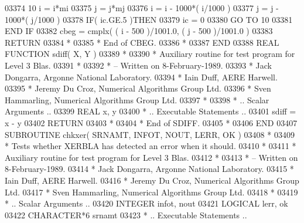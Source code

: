 \begin{DoxyCode}
03374    10 i = i*mi
03375       j = j*mj
03376       i = i - 1000*( i/1000 )
03377       j = j - 1000*( j/1000 )
03378       \textcolor{keywordflow}{IF}( ic.GE.5 )\textcolor{keywordflow}{THEN}
03379          ic = 0
03380          \textcolor{keywordflow}{GO TO} 10
03381 \textcolor{keywordflow}{      END IF}
03382       cbeg = cmplx( ( i - 500 )/1001.0, ( j - 500 )/1001.0 )
03383       \textcolor{keywordflow}{RETURN}
03384 \textcolor{comment}{*}
03385 \textcolor{comment}{*     End of CBEG.}
03386 \textcolor{comment}{*}
03387 \textcolor{keyword}{      END}
03388 \textcolor{keyword}{      REAL }\textcolor{keyword}{FUNCTION }sdiff( X, Y )
03389 \textcolor{comment}{*}
03390 \textcolor{comment}{*  Auxiliary routine for test program for Level 3 Blas.}
03391 \textcolor{comment}{*}
03392 \textcolor{comment}{*  -- Written on 8-February-1989.}
03393 \textcolor{comment}{*     Jack Dongarra, Argonne National Laboratory.}
03394 \textcolor{comment}{*     Iain Duff, AERE Harwell.}
03395 \textcolor{comment}{*     Jeremy Du Croz, Numerical Algorithms Group Ltd.}
03396 \textcolor{comment}{*     Sven Hammarling, Numerical Algorithms Group Ltd.}
03397 \textcolor{comment}{*}
03398 \textcolor{comment}{*     .. Scalar Arguments ..}
03399       \textcolor{keywordtype}{REAL}               x, y
03400 \textcolor{comment}{*     .. Executable Statements ..}
03401       sdiff = x - y
03402       \textcolor{keywordflow}{RETURN}
03403 \textcolor{comment}{*}
03404 \textcolor{comment}{*     End of SDIFF.}
03405 \textcolor{comment}{*}
03406 \textcolor{keyword}{      END}
03407 \textcolor{keyword}{      SUBROUTINE }chkxer( SRNAMT, INFOT, NOUT, LERR, OK )
03408 \textcolor{comment}{*}
03409 \textcolor{comment}{*  Tests whether XERBLA has detected an error when it should.}
03410 \textcolor{comment}{*}
03411 \textcolor{comment}{*  Auxiliary routine for test program for Level 3 Blas.}
03412 \textcolor{comment}{*}
03413 \textcolor{comment}{*  -- Written on 8-February-1989.}
03414 \textcolor{comment}{*     Jack Dongarra, Argonne National Laboratory.}
03415 \textcolor{comment}{*     Iain Duff, AERE Harwell.}
03416 \textcolor{comment}{*     Jeremy Du Croz, Numerical Algorithms Group Ltd.}
03417 \textcolor{comment}{*     Sven Hammarling, Numerical Algorithms Group Ltd.}
03418 \textcolor{comment}{*}
03419 \textcolor{comment}{*     .. Scalar Arguments ..}
03420       \textcolor{keywordtype}{INTEGER}            infot, nout
03421       \textcolor{keywordtype}{LOGICAL}            lerr, ok
03422       \textcolor{keywordtype}{CHARACTER*6}        srnamt
03423 \textcolor{comment}{*     .. Executable Statements ..}

\end{DoxyCode}
